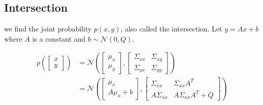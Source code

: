 \documentclass[12pt,a4paper]{article}
\begin{document}
\subsection{Intersection}
\label{Appendix:gauss_intersection}

we find the joint probability $p(x, y)$, also called the intersection. Let $y = Ax + b$ where $A$ is a constant and $b \sim \mathcal{N}(0, Q)$.

$$
\begin{aligned}
p\left(\left[\begin{array}{l}
x \\
y
\end{array}\right]\right) &=\mathcal{N}\left(\left[\begin{array}{l}
\mu_{x} \\
\mu_{y}
\end{array}\right],\left[\begin{array}{cc}
\Sigma_{x x} & \Sigma_{x y} \\
\Sigma_{y x} & \Sigma_{y y}
\end{array}\right]\right) \\
&=\mathcal{N}\left(\left[\begin{array}{c}
\mu_{x} \\
A \mu_{x}+b
\end{array}\right],\left[\begin{array}{cc}
\Sigma_{x x} & \Sigma_{x x} A^{T} \\
A \Sigma_{x x} & A \Sigma_{x x} A^{T}+Q
\end{array}\right]\right)
\end{aligned}
$$


\newpage

\end{document}
